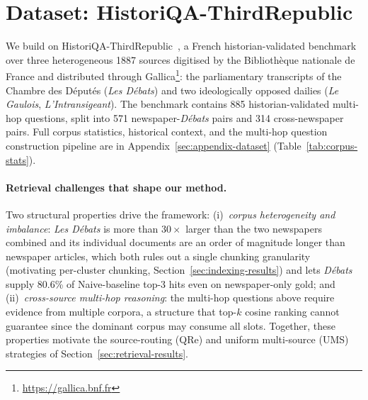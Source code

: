 \section{Dataset: HistoriQA-ThirdRepublic}
\label{sec:dataset}

We build on HistoriQA-ThirdRepublic~\cite{historiqa-pellet}, a French
historian-validated benchmark over three heterogeneous 1887 sources
digitised by the Biblioth\`eque nationale de France and distributed
through Gallica\footnote{\url{https://gallica.bnf.fr}}:
the parliamentary transcripts of the Chambre des D\'eput\'es
(\textit{Les D\'ebats}) and two ideologically opposed dailies
(\textit{Le Gaulois}, \textit{L'Intransigeant}). The benchmark
contains 885 historian-validated multi-hop questions, split into
571 newspaper-\textit{D\'ebats} pairs and 314 cross-newspaper
pairs. Full corpus statistics, historical context, and the multi-hop
question construction pipeline are in Appendix~\ref{sec:appendix-dataset}
(Table~\ref{tab:corpus-stats}).

\paragraph{Retrieval challenges that shape our method.}
Two structural properties drive the framework: (i)~\emph{corpus
heterogeneity and imbalance}: \textit{Les D\'ebats} is more than
$30\times$ larger than the two newspapers combined and its individual
documents are an order of magnitude longer than newspaper articles,
which both rules out a single chunking granularity (motivating
per-cluster chunking, Section~\ref{sec:indexing-results}) and lets
\textit{D\'ebats} supply 80.6\% of Naive-baseline top-3 hits even on
newspaper-only gold; and (ii)~\emph{cross-source multi-hop reasoning}:
the multi-hop questions above require evidence from multiple corpora,
a structure that top-$k$ cosine ranking cannot guarantee since the
dominant corpus may consume all slots. Together, these properties
motivate the source-routing (QRe) and uniform multi-source (UMS)
strategies of Section~\ref{sec:retrieval-results}.